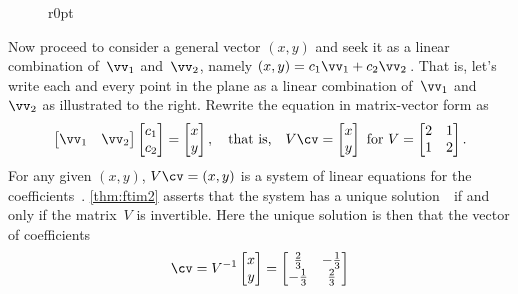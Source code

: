 \begin{example}
\begin{solution}
\begin{wrapfigure}r{0pt}
\end{wrapfigure}
Now proceed to consider a general vector \((x,y)\) and seek it as a linear combination of~\(\vv_1\) and~\(\vv_2\), namely \((x,y)=c_1\vv_1+c_2\vv_2\)\,.
That is, let's write each and every point in the plane as a linear combination of~\(\vv_1\) and~\(\vv_2\) as illustrated to the right.
Rewrite the equation in matrix-vector form as
\begin{equation*}
\begin{bmatrix} \vv_1&\vv_2 \end{bmatrix}
\begin{bmatrix} c_1\\c_2 \end{bmatrix}
=\begin{bmatrix} x\\y \end{bmatrix}
,\quad\text{that is,}\quad
V\cv=\begin{bmatrix} x\\y \end{bmatrix}
\text{ for }V=\begin{bmatrix} 2&1\\1&2 \end{bmatrix}.
\end{equation*}
For any given \((x,y)\), \(V\cv=(x,y)\) is a system of linear equations for the coefficients~\cv.
\cref{thm:ftim2} asserts that the system has a unique solution~\cv\ if and only if the matrix~\(V\) is invertible.
Here the unique solution is then that the vector of coefficients
\begin{equation*}
\cv=V^{-1}\begin{bmatrix} x\\y \end{bmatrix}
=\begin{bmatrix} \frac23&-\frac13\\-\frac13&\frac23 \end{bmatrix}

\end{equation*}
\end{solution}
\end{example}
